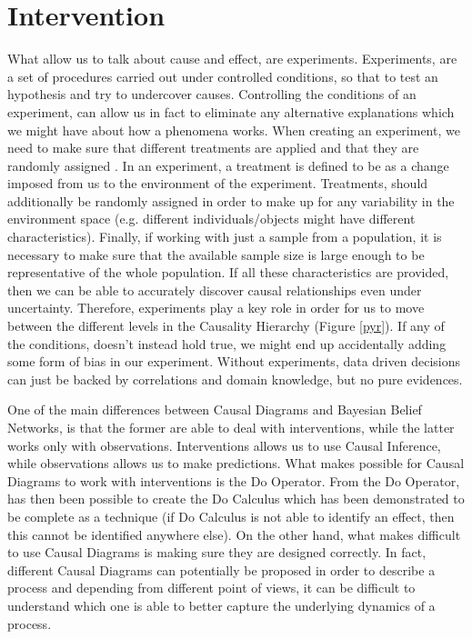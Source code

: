 \section{Intervention}
What allow us to talk about cause and effect, are experiments. Experiments, are a set of procedures carried out under controlled conditions, so that to test an hypothesis and try to undercover causes. Controlling the conditions of an experiment, can allow us in fact to eliminate any alternative explanations which we might have about how a phenomena works. When creating an experiment, we need to make sure that different treatments are applied and that they are randomly assigned \cite{cassie}. In an experiment, a treatment is defined to be as a change imposed from us to the environment of the experiment. Treatments, should additionally be randomly assigned in order to make up for any variability in the environment space (e.g. different individuals/objects might have different characteristics). Finally, if working with just a sample from a population, it is necessary to make sure that the available sample size is large enough to be representative of the whole population. If all these characteristics are provided, then we can be able to accurately discover causal relationships even under uncertainty. Therefore, experiments play a key role in order for us to move between the different levels in the Causality Hierarchy (Figure \ref{pyr}). If any of the conditions, doesn't instead hold true, we might end up accidentally adding some form of bias in our experiment. Without experiments, data driven decisions can just be backed by correlations and domain knowledge, but no pure evidences.

One of the main differences between Causal Diagrams and Bayesian Belief Networks, is that the former are able to deal with interventions, while the latter works only with observations. Interventions allows us to use Causal Inference, while observations allows us to make predictions. What makes possible for Causal Diagrams to work with interventions is the Do Operator. From the Do Operator, has then been possible to create the Do Calculus which has been demonstrated to be complete as a technique (if Do Calculus is not able to identify an effect, then this cannot be identified anywhere else). On the other hand, what makes difficult to use Causal Diagrams is making sure they are designed correctly. In fact, different Causal Diagrams can potentially be proposed in order to describe a process and depending from different point of views, it can be difficult to understand which one is able to better capture the underlying dynamics of a process.

